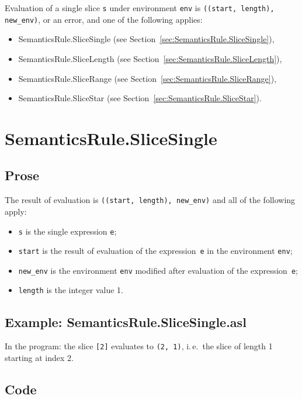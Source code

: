 \documentclass{book}
\begin{document}
Evaluation of a single slice \texttt{s} under environment \texttt{env} is
\texttt{((start, length), new\_env)}, or an error, and one of the following applies:
\begin{itemize}
\item SemanticsRule.SliceSingle (see Section~\ref{sec:SemanticsRule.SliceSingle}),
\item SemanticsRule.SliceLength (see Section~\ref{sec:SemanticsRule.SliceLength}),
\item SemanticsRule.SliceRange (see Section~\ref{sec:SemanticsRule.SliceRange}),
\item SemanticsRule.SliceStar (see Section~\ref{sec:SemanticsRule.SliceStar}).
\end{itemize}

\section{SemanticsRule.SliceSingle \label{sec:SemanticsRule.SliceSingle}}

  \subsection{Prose}
  The result of evaluation is \texttt{((start, length), new\_env)} and all
of the following apply:
  \begin{itemize}
    \item \texttt{s} is the single expression \texttt{e};
    \item \texttt{start} is the result of evaluation of the expression~\texttt{e}
      in the environment \texttt{env};
    \item \texttt{new\_env} is the environment \texttt{env} modified after
      evaluation of the expression~\texttt{e};
    \item \texttt{length} is the integer value 1.
  \end{itemize}

  \subsection{Example: SemanticsRule.SliceSingle.asl}
  In the program:
  the slice \texttt{[2]} evaluates to \texttt{(2, 1)}, i.\,e.\ the slice of
  length 1 starting at index 2.

  \subsection{Code}
\end{document}
